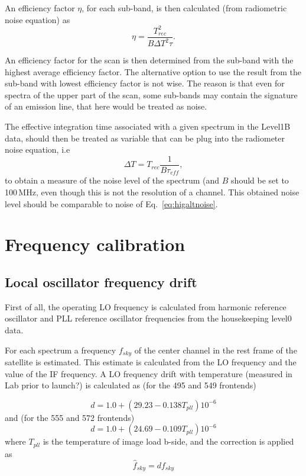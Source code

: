 An efficiency factor \(\eta\), for each sub-band, is then calculated (from radiometric noise equation) as
\begin{equation}
\eta = \frac{T_{rec}^2}{B\Delta T^{2}\tau}.
\end{equation}

An efficiency factor for the scan is then determined from the sub-band
with the highest average efficiency factor. The alternative option
to use the result from the sub-band with lowest efficiency factor
is not wise. The reason is that even for spectra of the upper part
of the scan, some sub-bands may contain the signature of an emission 
line, that here would be treated as noise.

The effective integration time associated with a given spectrum
in the Level1B data, should then be treated as 
variable that can be plug into the radiometer noise equation,
i.e
\begin{equation}
\Delta T = T_{rec}\frac{1}{B\tau_{eff}},
\end{equation}
to obtain a measure of the noise level of the spectrum
(and \(B\) should be set to 100\,MHz, even though this is not
the resolution of a channel.
This obtained noise level should be comparable to noise 
of Eq.~\ref{eq:higaltnoise}.


\section{Frequency calibration}

\subsection{Local oscillator frequency drift}

First of all, the operating LO frequency is calculated
from harmonic reference oscillator and PLL reference oscillator 
frequencies from the housekeeping level0 data.

For each spectrum a frequency \(f_{sky}\) of the center channel in 
the rest frame of the satellite is estimated.
This estimate is calculated from the LO frequency and the 
value of the IF frequency.
A LO frequency drift with temperature (measured in Lab prior to launch?) 
is calculated as (for the 495 and 549 frontends)

\begin{equation}
  d = 1.0+(29.23-0.138T_{pll})10^{-6}
\end{equation}
and (for the 555 and 572 frontends)
\begin{equation}
  d = 1.0+(24.69-0.109T_{pll})10^{-6}
\end{equation}
where \(T_{pll}\) is the temperature of image load b-side,
and the correction is applied as
\begin{equation}
 \hat{f}_{sky}= d f_{sky}
\end{equation}


